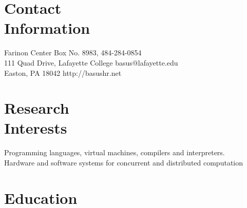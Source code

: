 \documentclass[margin,line]{resume}
\begin{document}
\begin{resume}


    \section{\mysidestyle Contact\\Information}%

    Farinon Center Box No. 8983,              \hfill 484-284-0854            \\
    111 Quad Drive, Lafayette College         \hfill basus@lafayette.edu    \\
    Easton, PA 18042                          \hfill http://basushr.net


    \section{\mysidestyle Research\\Interests}

    Programming languages, virtual machines, compilers and interpreters. \\
    Hardware and software systems for concurrent and distributed computation 

    \section{\mysidestyle Education}


\end{resume}
\end{document}

